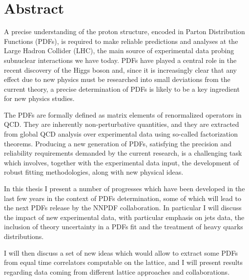 \chapter*{Abstract}

A precise understanding of the proton structure, encoded in Parton Distribution Functions (PDFs), is required 
to make reliable predictions and analyses at the Large Hadron Collider (LHC), 
the main source of experimental data probing subnuclear interactions we have today.
PDFs have played a central role in the recent 
discovery of the Higgs boson and, since it is increasingly clear that any effect due to new physics must be researched 
into small deviations from the current theory, a precise determination of PDFs is likely to be a key ingredient 
for new physics studies.

The PDFs are formally defined as matrix elements of renormalized operators in QCD.
They are inherently non-perturbative quantities, and they are extracted from global QCD analysis over
experimental data using so-called factorization theorems. 
Producing a new generation of PDFs, satisfying the precision and reliability requirements demanded by the current research,
is a challenging task which involves, together with the experimental data input, the development of robust
fitting methodologies, along with new physical ideas. 

In this thesis I present a number of progresses which have been developed in the last few years in the context of 
PDFs determination, some of which will lead to the next PDFs release by the NNPDF collaboration. 
In particular I will discuss the impact of new experimental data, with particular emphasis 
on jets data, the inclusion of theory uncertainty in a PDFs fit and the treatment of heavy quarks distributions.

I will then discuss a set of new ideas which would allow to extract some PDFs from equal time correlators computable on
the lattice, and I will present results regarding data coming from different lattice approaches and collaborations. 


